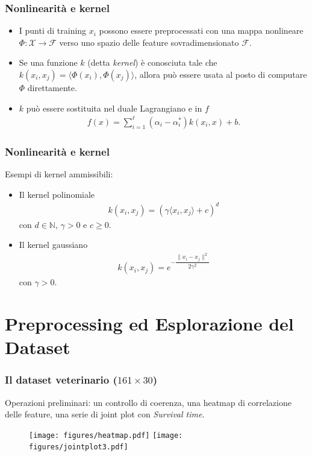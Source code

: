 \documentclass[table]{beamer}
\newcommand*{\sectionp}{\usebeamertemplate*{section p}}
\newcommand{\nologo}{\setbeamertemplate{logo}{}}
\begin{document}
\begin{frame}
\frametitle{Nonlinearità e kernel}
\begin{itemize}
\item I punti di training $ x_{i} $ possono essere preprocessati con una mappa nonlineare $ \Phi : \mathcal{X} \rightarrow \mathcal{F} $ verso uno spazio delle feature sovradimensionato $ \mathcal{F} $.
\item Se una funzione $ k $ (detta \textit{kernel}) è conosciuta tale che $ k(x_{i},x_{j}) = \langle\Phi (x_{i}),\Phi (x_{j})\rangle $, allora può essere usata al posto di computare $ \Phi $ direttamente.
\item $k$ può essere sostituita nel duale Lagrangiano e in $f$
\begin{align*}
f(x) = \sum_{i=1}^{\ell}(\alpha_{i}-\alpha_{i}^{*})k(x_{i},x) + b \text{.}
\end{align*}
\end{itemize}
\end{frame}

\begin{frame}
\frametitle{Nonlinearità e kernel}
Esempi di kernel ammissibili:
\begin{itemize}
\item Il kernel polinomiale \begin{align*}
k(x_{i},x_{j}) = (\gamma\langle x_{i},x_{j} \rangle + c)^{d}
\end{align*}
con $ d \in \mathbb{N} $, $ \gamma > 0 $ e $ c \geq 0 $.
\item Il kernel gaussiano \begin{align*}
k(x_{i},x_{j}) = e^{-\dfrac{\| x_{i}-x_{j} \|^{2}}{2\gamma^{2}}}
\end{align*}
con $ \gamma > 0 $.
\end{itemize}
\end{frame}

\section{Preprocessing ed Esplorazione del Dataset}
\frame{\sectionp}

{\nologo
\begin{frame}
\frametitle{Il dataset veterinario ($ 161 \times 30$)}
Operazioni preliminari: un controllo di coerenza, una heatmap di correlazione delle feature, una serie di joint plot con \textit{Survival time}.
\begin{figure}[h]
  \vspace{-0.2cm}
  \centering
  	\texttt{[image: figures/heatmap.pdf]}
  	\texttt{[image: figures/jointplot3.pdf]}
\end{figure}
\end{frame}}
\end{document}
